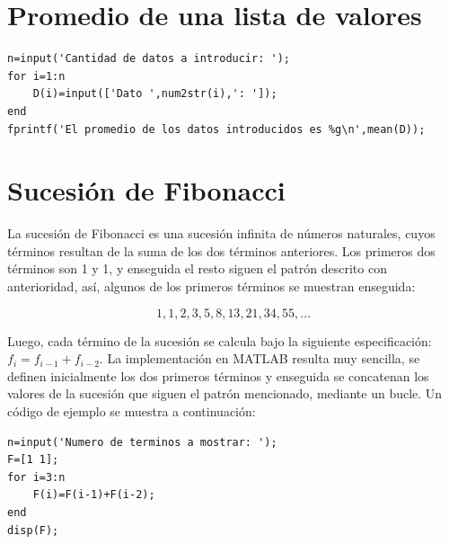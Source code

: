 \section{Promedio de una lista de valores}


\sol

\begin{verbatim}
n=input('Cantidad de datos a introducir: ');
for i=1:n
    D(i)=input(['Dato ',num2str(i),': ']);
end
fprintf('El promedio de los datos introducidos es %g\n',mean(D));
\end{verbatim}


\section{Sucesión de Fibonacci}


\sol

La sucesión de Fibonacci es una sucesión infinita de números naturales, cuyos términos resultan de la 
suma de los dos términos anteriores. Los primeros dos términos son 1 y 1, y enseguida el resto siguen 
el patrón descrito con anterioridad, así, algunos de los primeros términos se muestran enseguida:

$$ 1,1,2,3,5,8,13,21,34,55,... $$

Luego, cada término de la sucesión se calcula bajo la siguiente especificación: $f_i=f_{i-1}+f_{i-2}$. 
La implementación en MATLAB resulta muy sencilla, se definen inicialmente los dos primeros términos y 
enseguida se concatenan los valores de la sucesión que siguen el patrón mencionado, mediante un bucle. 
Un código de ejemplo se muestra a continuación:

\begin{verbatim}
n=input('Numero de terminos a mostrar: ');
F=[1 1];
for i=3:n
    F(i)=F(i-1)+F(i-2);
end
disp(F);
\end{verbatim}


